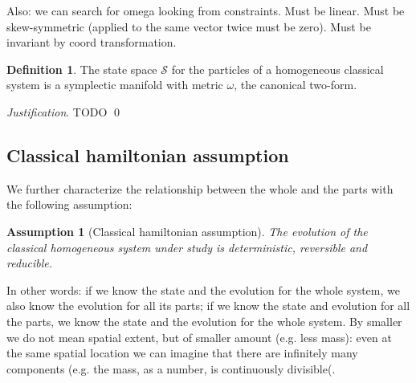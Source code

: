 \documentclass[aps,pra,10pt,twocolumn,floatfix,nofootinbib]{revtex4-1}
\newtheorem{assump}{Assumption}
\theoremstyle{definition}
\newtheorem{defn}[prop]{Definition}
\newenvironment{justification}{\emph{Justification}.}{\qed}
\begin{document}
Also: we can search for omega looking from constraints. Must be linear. Must be skew-symmetric (applied to the same vector twice must be zero). Must be invariant by coord transformation. 

\begin{defn}\label{symplectic_manifold}
	The state space $\mathcal{S}$ for the particles of a homogeneous classical  system is a symplectic manifold with metric $\omega$, the canonical two-form.
\end{defn}

\begin{justification}
	TODO
\end{justification}

\subsection{Classical hamiltonian assumption}


We further characterize the relationship between the whole and the parts with the following assumption:

\begin{assump}[Classical hamiltonian assumption]\label{classical}
	The evolution of the classical homogeneous system under study is deterministic, reversible and reducible.
\end{assump}

In other words: if we know the state and the evolution for the whole system, we also know the evolution for all its parts; if we know the state and evolution for all the parts, we know the state and the evolution for the whole system. By smaller we do not mean spatial extent, but of smaller amount (e.g. less mass): even at the same spatial location we can imagine that there are infinitely many components (e.g. the mass, as a number, is continuously divisible(.
\end{document}

